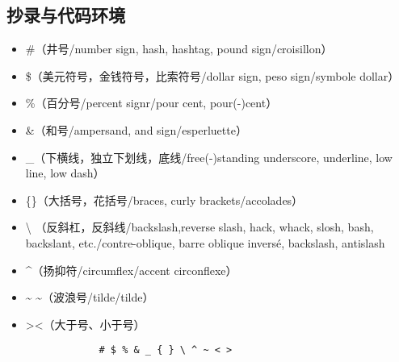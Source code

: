 \documentclass[twoside]{ctexart}
\begin{document}
    \subsection{抄录与代码环境}
            \begin{itemize}
                \item \#（井号/number sign, hash, hashtag, pound sign/croisillon）
                \item \$（美元符号，金钱符号，比索符号/dollar sign, peso sign/symbole dollar）
                \item \%（百分号/percent signr/pour cent, pour(-)cent）
                \item \&（和号/ampersand, and sign/esperluette）
                \item \_（下横线，独立下划线，底线/free(-)standing underscore, underline, low line, low dash）
                \item \{\}（大括号，花括号/braces, curly brackets/accolades）
                \item \textbackslash \textrm{} {\rmfamily {}}（反斜杠，反斜线/backslash,reverse slash, hack, whack, slosh, bash, backslant, etc./contre-oblique, barre oblique inversé, backslash, antislash
                \item \^{}（扬抑符/circumflex/accent circonflexe）
                \item \~{} \textasciitilde（波浪号/tilde/tilde）
                \item \textgreater \textless（大于号、小于号）
            \end{itemize}
        

            \begin{verbatim}
                # $ % & _ { } \ ^ ~ < >
            \end{verbatim}
        
\end{document}
